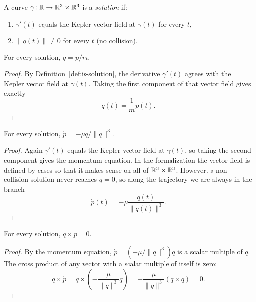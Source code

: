 \begin{definition}[Solutions]\label{def:is-solution}
A curve $\gamma \colon \mathbb{R} \to \mathbb{R}^3 \times \mathbb{R}^3$ is a \emph{solution} if:
\begin{enumerate}
  \item $\gamma'(t)$ equals the Kepler vector field at $\gamma(t)$ for every $t$,
  \item $\|q(t)\| \neq 0$ for every $t$ (no collision).
\end{enumerate}
\leanok
\end{definition}

\begin{proposition}\label{thm:position-equation}
For every solution, $\dot q = p/m$.
\leanok
\begin{proof}
By Definition~\ref{def:is-solution}, the derivative $\gamma'(t)$ agrees with the Kepler vector field at $\gamma(t)$.
Taking the first component of that vector field gives exactly
\[
  \dot q(t) = \frac{1}{m}p(t).
\]
\end{proof}
\end{proposition}

\begin{proposition}\label{thm:momentum-equation}
For every solution, $\dot p = -\mu q/\|q\|^3$.
\leanok
\begin{proof}
Again $\gamma'(t)$ equals the Kepler vector field at $\gamma(t)$, so taking the second component gives the momentum equation.
In the formalization the vector field is defined by cases so that it makes sense on all of $\mathbb{R}^3 \times \mathbb{R}^3$.
However, a non-collision solution never reaches $q = 0$, so along the trajectory we are always in the branch
\[
  \dot p(t) = -\mu \frac{q(t)}{\|q(t)\|^3}.
\]
\end{proof}
\end{proposition}

\begin{proposition}\label{thm:radial-force}
For every solution, $q \times \dot p = 0$.
\leanok
\begin{proof}
By the momentum equation, $\dot p = (-\mu/\|q\|^3)q$ is a scalar multiple of $q$.
The cross product of any vector with a scalar multiple of itself is zero:
\[
  q \times \dot p
  = q \times \!\left(-\frac{\mu}{\|q\|^3}q\right)
  = -\frac{\mu}{\|q\|^3}(q \times q)
  = 0.
\]
\end{proof}
\end{proposition}

